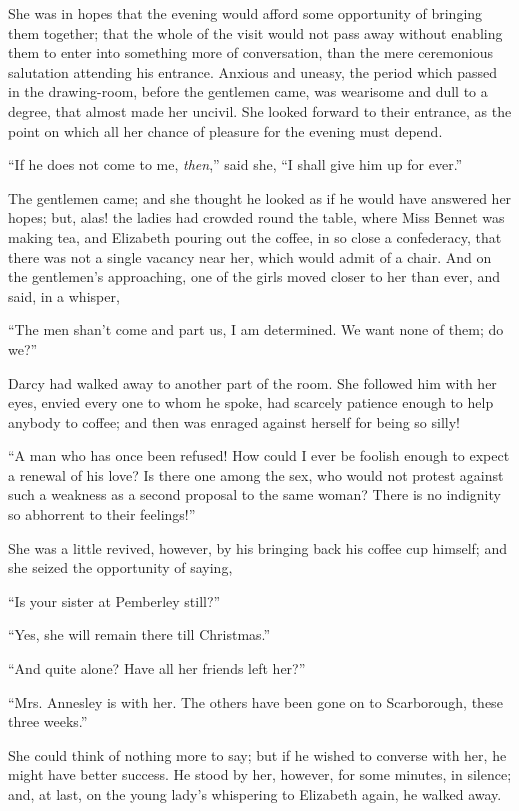 She was in hopes that the evening would afford some
opportunity of bringing them together; that the whole
of the visit would not pass away without enabling them
to enter into something more of conversation, than the
mere ceremonious salutation attending his entrance.
Anxious and uneasy, the period which passed in the
drawing-room, before the gentlemen came, was wearisome
and dull to a degree, that almost made her uncivil. She
looked forward to their entrance, as the point on
which all her chance of pleasure for the evening must
depend.

“If he does not come to me, \textit{then},” said she, “I shall
give him up for ever.”

The gentlemen came; and she thought he looked as
if he would have answered her hopes; but, alas! the
ladies had crowded round the table, where Miss Bennet
was making tea, and Elizabeth pouring out the coffee, in
so close a confederacy, that there was not a single vacancy
near her, which would admit of a chair. And on the
gentlemen’s approaching, one of the girls moved closer
to her than ever, and said, in a whisper,

“The men shan’t come and part us, I am determined.
We want none of them; do we?”

Darcy had walked away to another part of the room.
She followed him with her eyes, envied every one to whom
he spoke, had scarcely patience enough to help anybody
to coffee; and then was enraged against herself for being
so silly!

“A man who has once been refused! How could I ever
be foolish enough to expect a renewal of his love? Is there
one among the sex, who would not protest against such
a weakness as a second proposal to the same woman?
There is no indignity so abhorrent to their feelings!”

She was a little revived, however, by his bringing back
his coffee cup himself; and she seized the opportunity
of saying,

“Is your sister at Pemberley still?”

“Yes, she will remain there till Christmas.”

“And quite alone? Have all her friends left her?”

“Mrs. Annesley is with her. The others have been gone
on to Scarborough, these three weeks.”

She could think of nothing more to say; but if he
wished to converse with her, he might have better success.
He stood by her, however, for some minutes, in silence;
and, at last, on the young lady’s whispering to Elizabeth
again, he walked away.

